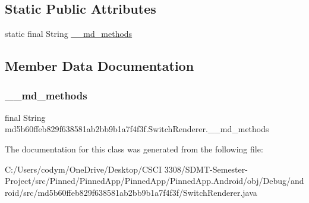 \subsection*{Static Public Attributes}
\begin{DoxyCompactItemize}
\item 
static final String \hyperlink{classmd5b60ffeb829f638581ab2bb9b1a7f4f3f_1_1_switch_renderer_a5d8d51148704e49b135709f942738f92}{\+\_\+\+\_\+md\+\_\+methods}
\end{DoxyCompactItemize}


\subsection{Member Data Documentation}
\mbox{\label{classmd5b60ffeb829f638581ab2bb9b1a7f4f3f_1_1_switch_renderer_a5d8d51148704e49b135709f942738f92}} 
\subsubsection{\texorpdfstring{\+\_\+\+\_\+md\+\_\+methods}{\_\_md\_methods}}
{\footnotesize\ttfamily final String md5b60ffeb829f638581ab2bb9b1a7f4f3f.\+Switch\+Renderer.\+\_\+\+\_\+md\+\_\+methods\hspace{0.3cm}{\ttfamily [static]}}



The documentation for this class was generated from the following file\+:\begin{DoxyCompactItemize}
\item 
C\+:/\+Users/codym/\+One\+Drive/\+Desktop/\+C\+S\+C\+I 3308/\+S\+D\+M\+T-\/\+Semester-\/\+Project/src/\+Pinned/\+Pinned\+App/\+Pinned\+App/\+Pinned\+App.\+Android/obj/\+Debug/android/src/md5b60ffeb829f638581ab2bb9b1a7f4f3f/Switch\+Renderer.\+java\end{DoxyCompactItemize}
